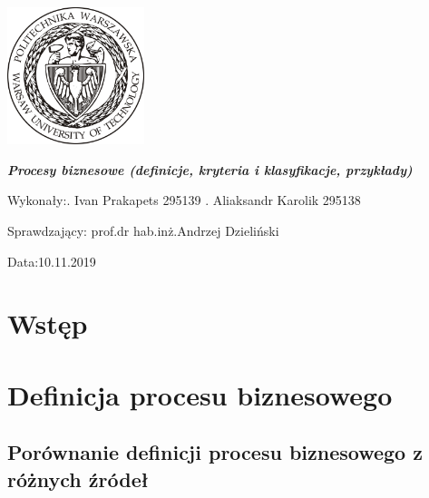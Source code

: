 \documentclass[a4paper, 12pt]{article}
\newcommand{\mainmatter}{\clearpage \cfoot{\thepage\ of \pageref{LastPage}}
\pagenumbering{arabic}}
\begin{document}
	\begin{titlepage}
\includegraphics[width = 40mm]{logo.jpg}
		\begin{center}
    			\vspace{3cm}
    					\Large\textit{\textbf{Procesy biznesowe (definicje, kryteria i klasyfikacje, przykłady)}}
   			\vspace{4cm}
		\end{center} 

		\hfill\begin{minipage}{0.54\textwidth}
			\Large Wykonały:. Ivan Prakapets 295139 . Aliaksandr Karolik 295138
		\vspace{\baselineskip}
		\end{minipage}
		
		\hfill\begin{minipage}{0.54\textwidth}
			\Large Sprawdzający:\newline
		 		prof.dr hab.inż.Andrzej Dzieliński
\vspace{\baselineskip}
		\end{minipage}

		\hfill\begin{minipage}{0.54\textwidth}
			\Large Data:10.11.2019
			\vspace{\baselineskip}
		\end{minipage}
	\end{titlepage}
\newpage
\mainmatter
\setlength{\headheight}{15pt}
\doublespacing
\tableofcontents
\newpage

\linespread{0.5}

\section{Wstęp}

\section{Definicja procesu biznesowego} 
\subsection{Porównanie definicji procesu biznesowego z różnych źródeł}
\end{document}

